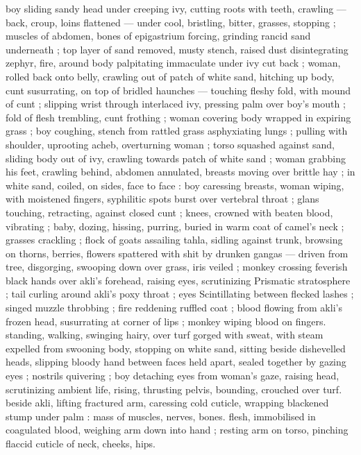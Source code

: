 boy sliding sandy head under creeping ivy, cutting roots with teeth, 
crawling --- back, croup, loins flattened --- under cool, bristling, 
bitter, grasses, stopping ; muscles of abdomen, bones of 
epigastrium forcing, grinding rancid sand underneath ; top layer of 
sand removed, musty stench, raised dust disintegrating zephyr, fire, 
around body palpitating immaculate under ivy cut back ; woman, 
rolled back onto belly, crawling out of patch of white sand, hitching 
up body, cunt susurrating, on top of bridled haunches --- touching 
fleshy fold, with mound of cunt ; slipping wrist through interlaced ivy, 
pressing palm over boy's mouth ; fold of flesh trembling, cunt 
frothing ; woman covering body wrapped in expiring grass ; boy 
coughing, stench from rattled grass asphyxiating lungs ; pulling with 
shoulder, uprooting acheb, overturning woman ; torso squashed 
against sand, sliding body out of ivy, crawling towards patch of white 
sand ; woman grabbing his feet, crawling behind, abdomen 
annulated, breasts moving over brittle hay ; in white sand, coiled, on 
sides, face to face : boy caressing breasts, woman wiping, with 
moistened fingers, syphilitic spots burst over vertebral throat ; glans 
touching, retracting, against closed cunt ; knees, crowned with 
beaten blood, vibrating ; baby, dozing, hissing, purring, buried in 
warm coat of camel's neck ; grasses crackling ; flock of goats 
assailing tahla, sidling against trunk, browsing on thorns, berries, 
flowers spattered with shit by drunken gangas --- driven from tree, 
disgorging, swooping down over grass, iris veiled ; monkey crossing 
feverish black hands over akli's forehead, raising eyes, scrutinizing 
Prismatic stratosphere ; tail curling around akli's poxy throat ; eyes 
Scintillating between flecked lashes ; singed muzzle throbbing ; fire 
reddening ruffled coat ; blood flowing from akli's frozen head, 
susurrating at corner of lips ; monkey wiping blood on fingers. 
standing, walking, swinging hairy, over turf gorged with sweat, with 
steam expelled from swooning body, stopping on white sand, sitting 
beside dishevelled heads, slipping bloody hand between faces held 
apart, sealed together by gazing eyes ; nostrils quivering ; boy 
detaching eyes from woman's gaze, raising head, scrutinizing 
ambient life, rising, thrusting pelvis, bounding, crouched over turf. 
beside akli, lifting fractured arm, caressing cold cuticle, wrapping 
blackened stump under palm : mass of muscles, nerves, bones. 
flesh, immobilised in coagulated blood, weighing arm down into hand 
; resting arm on torso, pinching flaccid cuticle of neck, cheeks, hips. 
